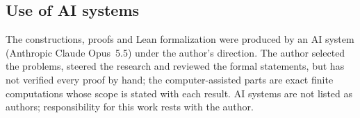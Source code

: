 \documentclass[11pt]{amsart}
\theoremstyle{definition}
\theoremstyle{plain}
\begin{document}
\subsection*{Use of AI systems}
The constructions, proofs and Lean formalization were produced by an AI system (Anthropic Claude Opus~5.5) under the author's direction. The author selected the problems, steered the research and reviewed the formal statements, but has not verified every proof by hand; the computer-assisted parts are exact finite computations whose scope is stated with each result. AI systems are not listed as authors; responsibility for this work rests with the author. %

\appendix



%




\end{document}
